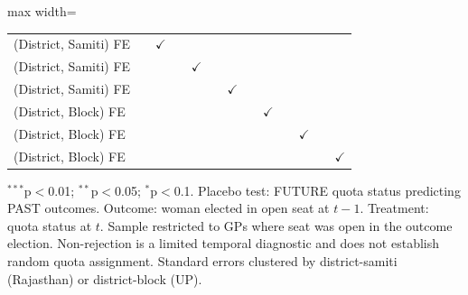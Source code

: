 \begin{adjustbox}{max width=\linewidth}
\begin{threeparttable}[b]
\begin{tabular}{lcccccccccccc}
          \\
         (District, Samiti) FE &              & $\checkmark$  &              &               &              &               &              &               &              &               &              & \\  
         (District, Samiti) FE &              &               &              & $\checkmark$  &              &               &              &               &              &               &              & \\  
         (District, Samiti) FE &              &               &              &               &              & $\checkmark$  &              &               &              &               &              & \\  
         (District, Block) FE  &              &               &              &               &              &               &              & $\checkmark$  &              &               &              & \\  
         (District, Block) FE  &              &               &              &               &              &               &              &               &              & $\checkmark$  &              & \\  
         (District, Block) FE  &              &               &              &               &              &               &              &               &              &               &              & $\checkmark$\\   
         \bottomrule
      \end{tabular}
      
      \begin{tablenotes}
         \item $^{***}$p$<$0.01; $^{**}$p$<$0.05; $^{*}$p$<$0.1. Placebo test: FUTURE quota status predicting PAST outcomes. Outcome: woman elected in open seat at $t-1$. Treatment: quota status at $t$. Sample restricted to GPs where seat was open in the outcome election. Non-rejection is a limited temporal diagnostic and does not establish random quota assignment. Standard errors clustered by district-samiti (Rajasthan) or district-block (UP).
      \end{tablenotes}
   \end{threeparttable}
\end{adjustbox}
\par\endgroup


